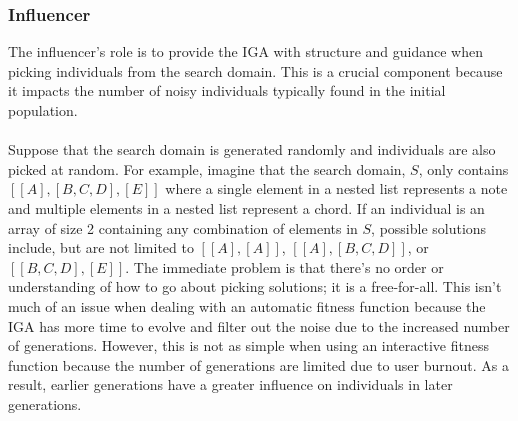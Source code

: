 \documentclass[12pt]{article} %
\begin{document}
\subsubsection{Influencer}
The influencer's role is to provide the IGA with structure and guidance when picking individuals from the search domain. This is a crucial component because it impacts the number of noisy individuals typically found in the initial population. \\
\\
Suppose that the search domain is generated randomly and individuals are also picked at random. For example, imagine that the search domain, $S$, only contains $[[A],[B,C,D],[E]]$ where a single element in a nested list represents a note and multiple elements in a nested list represent a chord. If an individual is an array of size 2 containing any combination of elements in $S$, possible solutions include, but are not limited to $[[A], [A]]$, $[[A], [B, C, D]]$, or $[[B, C, D], [E]]$. The immediate problem is that there’s no order or understanding of how to go about picking solutions; it is a free-for-all. This isn’t much of an issue when dealing with an automatic fitness function because the IGA has more time to evolve and filter out the noise due to the increased number of generations. However, this is not as simple when using an interactive fitness function because the number of generations are limited due to user burnout. As a result, earlier generations have a greater influence on individuals in later generations. \\
\end{document}
